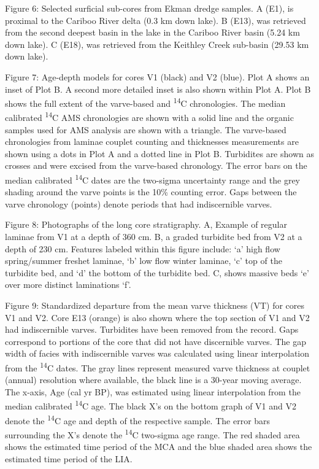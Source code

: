 \documentclass[
  letterpaper,
  DIV=11,
  numbers=noendperiod]{scrartcl}
\begin{document}
Figure 6: Selected surficial sub-cores from Ekman dredge samples. A
(E1), is proximal to the Cariboo River delta (0.3 km down lake). B
(E13), was retrieved from the second deepest basin in the lake in the
Cariboo River basin (5.24 km down lake). C (E18), was retrieved from the
Keithley Creek sub-basin (29.53 km down lake).

Figure 7: Age-depth models for cores V1 (black) and V2 (blue). Plot A
shows an inset of Plot B. A second more detailed inset is also shown
within Plot A. Plot B shows the full extent of the varve-based and
\textsuperscript{14}C chronologies. The median calibrated
\textsuperscript{14}C AMS chronologies are shown with a solid line and
the organic samples used for AMS analysis are shown with a triangle. The
varve-based chronologies from laminae couplet counting and thicknesses
measurements are shown using a dots in Plot A and a dotted line in Plot
B. Turbidites are shown as crosses and were excised from the varve-based
chronology. The error bars on the median calibrated
\textsuperscript{14}C dates are the two-sigma uncertainty range and the
grey shading around the varve points is the 10\% counting error. Gaps
between the varve chronology (points) denote periods that had
indiscernible varves.

Figure 8: Photographs of the long core stratigraphy. A, Example of
regular laminae from V1 at a depth of 360 cm. B, a graded turbidite bed
from V2 at a depth of 230 cm. Features labeled within this figure
include: `a' high flow spring/summer freshet laminae, `b' low flow
winter laminae, `c' top of the turbidite bed, and `d' the bottom of the
turbidite bed. C, shows massive beds `e' over more distinct laminations
`f'.

Figure 9: Standardized departure from the mean varve thickness (VT) for
cores V1 and V2. Core E13 (orange) is also shown where the top section
of V1 and V2 had indiscernible varves. Turbidites have been removed from
the record. Gaps correspond to portions of the core that did not have
discernible varves. The gap width of facies with indiscernible varves
was calculated using linear interpolation from the \textsuperscript{14}C
dates. The gray lines represent measured varve thickness at couplet
(annual) resolution where available, the black line is a 30-year moving
average. The x-axis, Age (cal yr BP), was estimated using linear
interpolation from the median calibrated \textsuperscript{14}C age. The
black X's on the bottom graph of V1 and V2 denote the
\textsuperscript{14}C age and depth of the respective sample. The error
bars surrounding the X's denote the \textsuperscript{14}C two-sigma age
range. The red shaded area shows the estimated time period of the MCA
and the blue shaded area shows the estimated time period of the LIA.
\end{document}
